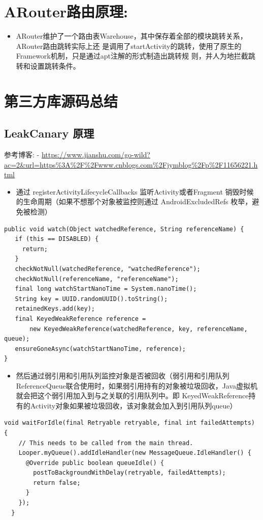 \documentclass[9pt, b5paper]{article}
\begin{document}
\section{ARouter路由原理:}
\label{sec-8}
\begin{itemize}
\item ARouter维护了一个路由表Warehouse，其中保存着全部的模块跳转关系，ARouter路由跳转实际上还 是调用了startActivity的跳转，使用了原生的Framework机制，只是通过apt注解的形式制造出跳转规 则，并人为地拦截跳转和设置跳转条件。
\end{itemize}

\section{第三方库源码总结}
\label{sec-9}
\subsection{LeakCanary 原理}
\label{sec-9-1}
参考博客: - \url{https://www.jianshu.com/go-wild?ac=2&url=https\%3A\%2F\%2Fwww.cnblogs.com\%2Fjymblog\%2Fp\%2F11656221.html}
\begin{itemize}
\item 通过 registerActivityLifecycleCallbacks 监听Activity或者Fragment 销毁时候的生命周期（如果不想那个对象被监控则通过 AndroidExcludedRefs 枚举，避免被检测）
\end{itemize}
\begin{verbatim}
public void watch(Object watchedReference, String referenceName) {
   if (this == DISABLED) {
     return;
   }
   checkNotNull(watchedReference, "watchedReference");
   checkNotNull(referenceName, "referenceName");
   final long watchStartNanoTime = System.nanoTime();
   String key = UUID.randomUUID().toString();
   retainedKeys.add(key);
   final KeyedWeakReference reference =
       new KeyedWeakReference(watchedReference, key, referenceName, queue);
   ensureGoneAsync(watchStartNanoTime, reference);
}
\end{verbatim}
\begin{itemize}
\item 然后通过弱引用和引用队列监控对象是否被回收（弱引用和引用队列ReferenceQueue联合使用时，如果弱引用持有的对象被垃圾回收，Java虚拟机就会把这个弱引用加入到与之关联的引用队列中。即 KeyedWeakReference持有的Activity对象如果被垃圾回收，该对象就会加入到引用队列queue）
\end{itemize}
\begin{verbatim}
void waitForIdle(final Retryable retryable, final int failedAttempts) {
    // This needs to be called from the main thread.
    Looper.myQueue().addIdleHandler(new MessageQueue.IdleHandler() {
      @Override public boolean queueIdle() {
        postToBackgroundWithDelay(retryable, failedAttempts);
        return false;
      }
    });
  }
\end{verbatim}
\end{document}
